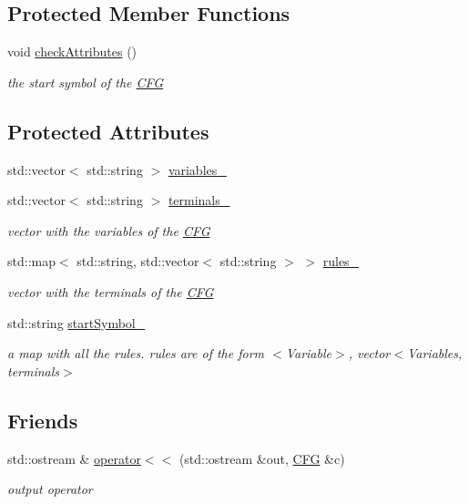 \subsection*{\-Protected \-Member \-Functions}
\begin{DoxyCompactItemize}
\item 
void \hyperlink{classGrammar_1_1CFG_af4c1e34192bf5b3e6e26b3240c6502b9}{check\-Attributes} ()
\begin{DoxyCompactList}\small\item\em the start symbol of the \hyperlink{classGrammar_1_1CFG}{\-C\-F\-G} \end{DoxyCompactList}\end{DoxyCompactItemize}
\subsection*{\-Protected \-Attributes}
\begin{DoxyCompactItemize}
\item 
std\-::vector$<$ std\-::string $>$ \hyperlink{classGrammar_1_1CFG_a7041e847818a2e4777bc41d0c2f1db2c}{variables\-\_\-}
\item 
std\-::vector$<$ std\-::string $>$ \hyperlink{classGrammar_1_1CFG_a65298cf1151bb130a382a4858d99a571}{terminals\-\_\-}
\begin{DoxyCompactList}\small\item\em vector with the variables of the \hyperlink{classGrammar_1_1CFG}{\-C\-F\-G} \end{DoxyCompactList}\item 
std\-::map$<$ std\-::string, \*
std\-::vector$<$ std\-::string $>$ $>$ \hyperlink{classGrammar_1_1CFG_a5d91974246061afc53951ef9fac313ad}{rules\-\_\-}
\begin{DoxyCompactList}\small\item\em vector with the terminals of the \hyperlink{classGrammar_1_1CFG}{\-C\-F\-G} \end{DoxyCompactList}\item 
std\-::string \hyperlink{classGrammar_1_1CFG_aaddc2586c72b3f257acf18bf98881623}{start\-Symbol\-\_\-}
\begin{DoxyCompactList}\small\item\em a map with all the rules. rules are of the form $<$\-Variable$>$, vector$<$\-Variables, terminals$>$ \end{DoxyCompactList}\end{DoxyCompactItemize}
\subsection*{\-Friends}
\begin{DoxyCompactItemize}
\item 
std\-::ostream \& \hyperlink{classGrammar_1_1CFG_a125cf827399aa731591064e741ab8fb7}{operator$<$$<$} (std\-::ostream \&out, \hyperlink{classGrammar_1_1CFG}{\-C\-F\-G} \&c)
\begin{DoxyCompactList}\small\item\em output operator \end{DoxyCompactList}\end{DoxyCompactItemize}



